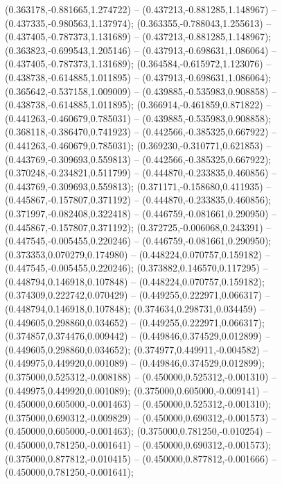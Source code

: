  (0.363178,-0.881665,1.274722) -- (0.437213,-0.881285,1.148967) -- (0.437335,-0.980563,1.137974);
 (0.363355,-0.788043,1.255613) -- (0.437405,-0.787373,1.131689) -- (0.437213,-0.881285,1.148967);
 (0.363823,-0.699543,1.205146) -- (0.437913,-0.698631,1.086064) -- (0.437405,-0.787373,1.131689);
 (0.364584,-0.615972,1.123076) -- (0.438738,-0.614885,1.011895) -- (0.437913,-0.698631,1.086064);
 (0.365642,-0.537158,1.009009) -- (0.439885,-0.535983,0.908858) -- (0.438738,-0.614885,1.011895);
 (0.366914,-0.461859,0.871822) -- (0.441263,-0.460679,0.785031) -- (0.439885,-0.535983,0.908858);
 (0.368118,-0.386470,0.741923) -- (0.442566,-0.385325,0.667922) -- (0.441263,-0.460679,0.785031);
 (0.369230,-0.310771,0.621853) -- (0.443769,-0.309693,0.559813) -- (0.442566,-0.385325,0.667922);
 (0.370248,-0.234821,0.511799) -- (0.444870,-0.233835,0.460856) -- (0.443769,-0.309693,0.559813);
 (0.371171,-0.158680,0.411935) -- (0.445867,-0.157807,0.371192) -- (0.444870,-0.233835,0.460856);
 (0.371997,-0.082408,0.322418) -- (0.446759,-0.081661,0.290950) -- (0.445867,-0.157807,0.371192);
 (0.372725,-0.006068,0.243391) -- (0.447545,-0.005455,0.220246) -- (0.446759,-0.081661,0.290950);
 (0.373353,0.070279,0.174980) -- (0.448224,0.070757,0.159182) -- (0.447545,-0.005455,0.220246);
 (0.373882,0.146570,0.117295) -- (0.448794,0.146918,0.107848) -- (0.448224,0.070757,0.159182);
 (0.374309,0.222742,0.070429) -- (0.449255,0.222971,0.066317) -- (0.448794,0.146918,0.107848);
 (0.374634,0.298731,0.034459) -- (0.449605,0.298860,0.034652) -- (0.449255,0.222971,0.066317);
 (0.374857,0.374476,0.009442) -- (0.449846,0.374529,0.012899) -- (0.449605,0.298860,0.034652);
 (0.374977,0.449911,-0.004582) -- (0.449975,0.449920,0.001089) -- (0.449846,0.374529,0.012899);
 (0.375000,0.525312,-0.008188) -- (0.450000,0.525312,-0.001310) -- (0.449975,0.449920,0.001089);
 (0.375000,0.605000,-0.009141) -- (0.450000,0.605000,-0.001463) -- (0.450000,0.525312,-0.001310);
 (0.375000,0.690312,-0.009829) -- (0.450000,0.690312,-0.001573) -- (0.450000,0.605000,-0.001463);
 (0.375000,0.781250,-0.010254) -- (0.450000,0.781250,-0.001641) -- (0.450000,0.690312,-0.001573);
 (0.375000,0.877812,-0.010415) -- (0.450000,0.877812,-0.001666) -- (0.450000,0.781250,-0.001641);
